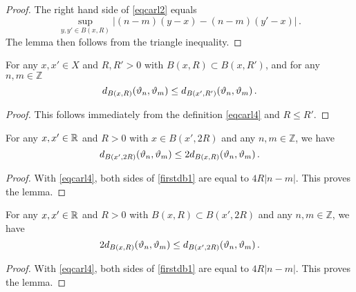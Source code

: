 \begin{proof}
\leanok
    The right hand side of \eqref{eqcarl2} equals
    $$
        \sup_{y,y'\in B(x,R)}|(n-m)(y-x)-(n-m)(y'-x)|\,.
    $$
    The lemma then follows from the triangle inequality.
\end{proof}

\begin{lemma}
\label{frequency-monotone}
\leanok

    For any $x, x' \in X$ and $R, R' > 0$ with $B(x,R) \subset B(x, R')$, and for any $n, m \in \mathbb{Z}$
    $$
        d_{B(x,R)}({\vartheta}_n, {\vartheta}_m) \le d_{B(x',R')}({\vartheta}_n, {\vartheta}_m)\,.
    $$
\end{lemma}

\begin{proof}
\leanok
    This follows immediately from the definition \eqref{eqcarl4} and $R \le R'$.
\end{proof}

\begin{lemma}
\label{frequency-ball-doubling}
\leanok
{}
  For any $x,x'\in {\mathbb{R}}$ and $R>0$ with
   $x\in B(x',2R)$ and any $n,m\in \mathbb{Z}$, we have
\begin{equation}\label{firstdb1}
    d_{B(x',2R)}({\vartheta}_n,{\vartheta}_m)\le 2 d_{B(x,R)}({\vartheta}_n,{\vartheta}_m) \, .
\end{equation}
\end{lemma}

\begin{proof}
\leanok
With \eqref{eqcarl4}, both sides of \eqref{firstdb1} are equal to $4R|n-m|$. This proves the lemma.
\end{proof}

\begin{lemma}
\label{frequency-ball-growth}
\leanok
    For any $x,x'\in {\mathbb{R}}$ and $R>0$ with
   $B(x,R)\subset B(x',2R)$ and any $n,m\in \mathbb{Z}$, we have
\begin{equation}\label{seconddb1}
    2d_{B(x,R)}({\vartheta}_n,{\vartheta}_m)\le d_{B(x',2R)}({\vartheta}_n,{\vartheta}_m) \, .
\end{equation}
\end{lemma}

\begin{proof}
\leanok
    With \eqref{eqcarl4}, both sides of \eqref{firstdb1} are equal to $4R|n-m|$. This proves the lemma.
\end{proof}

